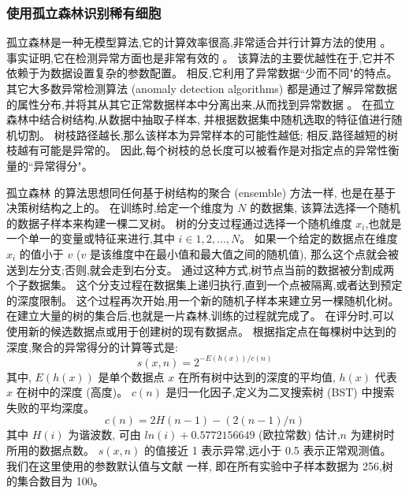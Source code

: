 \subsubsection{使用孤立森林识别稀有细胞}
\label{subsec:if} 

孤立森林是一种无模型算法,它的计算效率很高,非常适合并行计算方法的使用 。
事实证明,它在检测异常方面也是非常有效的 。
该算法的主要优越性在于,它并不依赖于为数据设置复杂的参数配置。
相反,它利用了异常数据``少而不同"的特点。
其它大多数异常检测算法 (anomaly detection algorithms) 都是通过了解异常数据的属性分布,并将其从其它正常数据样本中分离出来,从而找到异常数据 。
在孤立森林中结合树结构,从数据中抽取子样本,
并根据数据集中随机选取的特征值进行随机切割。
树枝路径越长,那么该样本为异常样本的可能性越低;
相反,路径越短的树枝越有可能是异常的。
因此,每个树枝的总长度可以被看作是对指定点的异常性衡量的``异常得分"。

孤立森林  的算法思想同任何基于树结构的聚合 (ensemble) 方法一样,
也是在基于决策树结构之上的。
在训练时,给定一个维度为 $N$ 的数据集,
该算法选择一个随机的数据子样本来构建一棵二叉树。
树的分支过程通过选择一个随机维度 $x_i$,也就是一个单一的变量或特征来进行,其中 $i \in {1,2,\ldots,N}$。
如果一个给定的数据点在维度 $x_i$ 的值小于 $v$ ($v$ 是该维度中在最小值和最大值之间的随机值),
那么这个点就会被送到左分支;否则,就会走到右分支。
通过这种方式,树节点当前的数据被分割成两个子数据集。
这个分支过程在数据集上递归执行,直到一个点被隔离,或者达到预定的深度限制。
这个过程再次开始,用一个新的随机子样本来建立另一棵随机化树。
在建立大量的树的集合后,也就是一片森林,训练的过程就完成了。
在评分时,可以使用新的候选数据点或用于创建树的现有数据点。
根据指定点在每棵树中达到的深度,聚合的异常得分的计算等式是:
\begin{equation}
    \label{as}
    s(x,n) = 2^{-E(h(x))/c(n)}
\end{equation}
其中, $E(h(x))$ 是单个数据点 $x$ 在所有树中达到的深度的平均值, $h(x)$ 代表 $x$ 在树中的深度 (高度)。 
$c(n)$ 是归一化因子,定义为二叉搜索树 (BST) 中搜索失败的平均深度。
\begin{equation}
    \label{lab:as}
    c(n) = 2H(n - 1) - (2(n - 1)/n)
\end{equation}
其中 $H(i)$ 为谐波数,
可由 $ln(i) + 0.5772156649$ (欧拉常数) 估计,$n$ 为建树时所用的数据点数。
$s(x,n)$ 的值接近 1 表示异常,远小于 0.5 表示正常观测值。
我们在这里使用的参数默认值与文献 一样,
即在所有实验中子样本数据为 256,树的集合数目为 100。

